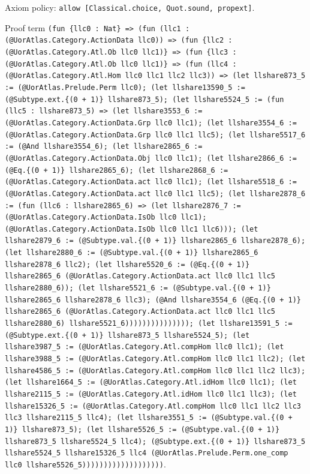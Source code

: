 \documentclass[11pt]{article}
\begin{document}
\noindent Axiom policy: \texttt{allow [Classical.choice, Quot.sound, propext]}.\par
\noindent Proof term \texttt{(fun \{llc0 : Nat\} => (fun (llc1 : (@UorAtlas.Category.ActionData llc0)) => (fun \{llc2 : (@UorAtlas.Category.Atl.Ob llc0 llc1)\} => (fun \{llc3 : (@UorAtlas.Category.Atl.Ob llc0 llc1)\} => (fun (llc4 : (@UorAtlas.Category.Atl.Hom llc0 llc1 llc2 llc3)) => (let llshare873\_5 := (@UorAtlas.Prelude.Perm llc0); (let llshare13590\_5 := (@Subtype.ext.\{(0 + 1)\} llshare873\_5); (let llshare5524\_5 := (fun (llc5 : llshare873\_5) => (let llshare3553\_6 := (@UorAtlas.Category.ActionData.Grp llc0 llc1); (let llshare3554\_6 := (@UorAtlas.Category.ActionData.Grp llc0 llc1 llc5); (let llshare5517\_6 := (@And llshare3554\_6); (let llshare2865\_6 := (@UorAtlas.Category.ActionData.Obj llc0 llc1); (let llshare2866\_6 := (@Eq.\{(0 + 1)\} llshare2865\_6); (let llshare2868\_6 := (@UorAtlas.Category.ActionData.act llc0 llc1); (let llshare5518\_6 := (@UorAtlas.Category.ActionData.act llc0 llc1 llc5); (let llshare2878\_6 := (fun (llc6 : llshare2865\_6) => (let llshare2876\_7 := (@UorAtlas.Category.ActionData.IsOb llc0 llc1); (@UorAtlas.Category.ActionData.IsOb llc0 llc1 llc6))); (let llshare2879\_6 := (@Subtype.val.\{(0 + 1)\} llshare2865\_6 llshare2878\_6); (let llshare2880\_6 := (@Subtype.val.\{(0 + 1)\} llshare2865\_6 llshare2878\_6 llc2); (let llshare5520\_6 := (@Eq.\{(0 + 1)\} llshare2865\_6 (@UorAtlas.Category.ActionData.act llc0 llc1 llc5 llshare2880\_6)); (let llshare5521\_6 := (@Subtype.val.\{(0 + 1)\} llshare2865\_6 llshare2878\_6 llc3); (@And llshare3554\_6 (@Eq.\{(0 + 1)\} llshare2865\_6 (@UorAtlas.Category.ActionData.act llc0 llc1 llc5 llshare2880\_6) llshare5521\_6))))))))))))))); (let llshare13591\_5 := (@Subtype.ext.\{(0 + 1)\} llshare873\_5 llshare5524\_5); (let llshare3987\_5 := (@UorAtlas.Category.Atl.compHom llc0 llc1); (let llshare3988\_5 := (@UorAtlas.Category.Atl.compHom llc0 llc1 llc2); (let llshare4586\_5 := (@UorAtlas.Category.Atl.compHom llc0 llc1 llc2 llc3); (let llshare1664\_5 := (@UorAtlas.Category.Atl.idHom llc0 llc1); (let llshare2115\_5 := (@UorAtlas.Category.Atl.idHom llc0 llc1 llc3); (let llshare15326\_5 := (@UorAtlas.Category.Atl.compHom llc0 llc1 llc2 llc3 llc3 llshare2115\_5 llc4); (let llshare3551\_5 := (@Subtype.val.\{(0 + 1)\} llshare873\_5); (let llshare5526\_5 := (@Subtype.val.\{(0 + 1)\} llshare873\_5 llshare5524\_5 llc4); (@Subtype.ext.\{(0 + 1)\} llshare873\_5 llshare5524\_5 llshare15326\_5 llc4 (@UorAtlas.Prelude.Perm.one\_comp llc0 llshare5526\_5)))))))))))))))))))}.\par
\end{document}
